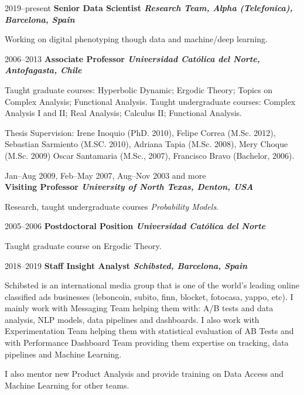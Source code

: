 \documentclass{article}
\begin{document}
\begin{CV}

\item[2019--present] {\bf Senior Data Scientist \it Research Team, Alpha (Telefonica), Barcelona, Spain}

  Working on digital phenotyping though data and machine/deep learning.
  
\item[2006--2013] {\bf Associate Professor \it Universidad Cat\'olica del Norte,
    Antofagasta, Chile}
  
  Taught graduate courses: Hyperbolic Dynamic; Ergodic Theory; Topics
  on Complex Analysis; Functional Analysis.  Taught undergraduate
  courses: Complex Analysis I and II; Real Analysis; Calculus II;
  Functional Analysis.

  Thesis Supervision: Irene Inoquio (PhD. 2010), Felipe Correa
  (M.Sc. 2012), Sebastian Sarmiento (M.SC. 2010), Adriana Tapia
  (M.Sc. 2008), Mery Choque (M.Sc. 2009) Oscar Santamaria (M.Sc.,
  2007), Francisco Bravo (Bachelor, 2006).

\item[Jan--Aug 2009, Feb--May 2007, Aug--Nov 2003 and more]
  {\ \\ \bf Visiting Professor \it University of North Texas, Denton, USA}
  
  Research, taught undergraduate courses \emph{Probability Models}.

\item[2005--2006] {\bf Postdoctoral Position \it Universidad Cat\'olica del Norte}

  Taught graduate course on Ergodic Theory.
  
\item[2018--2019] {\bf Staff Insight Analyst \it Schibsted, Barcelona, Spain}
  
  Schibsted is an international media group that is one of the world’s leading online classified ads
  businesses (leboncoin, subito, finn, blocket, fotocasa, yappo, etc). I mainly work with Messaging
  Team helping them with: A/B tests and data analysis, NLP models, data pipelines and dashboards.  I
  also work with Experimentation Team helping them with statistical evaluation of AB Tests and with
  Performance Dashboard Team providing them expertise on tracking, data pipelines and Machine
  Learning.

  I also mentor new Product Analysis and provide training on Data Access and Machine Learning for
  other teams.
  

\end{CV}
\end{document}
